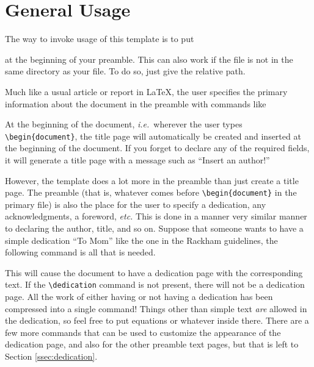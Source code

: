 \documentclass[thesis]{../cls/thesis-umich}
\begin{document}
\section{General Usage}
The way to invoke usage of this template is to put
at the beginning of your preamble.  This can also work if the
 file is not in the same directory as your
 file.  To do so, just give the relative path.

Much like a usual article or report in \LaTeX, the user specifies the
primary information about the document in the preamble with commands
like
\begin{code}
\author{Derek J. Dalle}
\end{code}
At the beginning of the document, \textit{i.e.}~wherever the user
types \verb|\begin{document}|, the title page will automatically be
created and inserted at the beginning of the document.  If you
forget to declare any of the required fields, it will generate a
title page with a message such as ``Insert an author!''

However, the template does a lot more in the preamble than just create
a title page.  The preamble (that is, whatever comes before
\verb|\begin{document}| in the primary  file) is also the
place for the user to specify a dedication, any acknowledgments, a
foreword, \textit{etc.}  This is done in a manner very similar manner
to declaring the author, title, and so on.  Suppose that someone wants
to have a simple dedication ``To Mom'' like the one in the Rackham
guidelines, the following command is all that is needed.
\begin{code}
\dedication{To Mom}
\end{code}
This will cause the document to have a dedication page with the
corresponding text.  If the \verb|\dedication| command is not present,
there will not be a dedication page.  All the work of either having or
not having a dedication has been compressed into a single command!
Things other than simple text \emph{are} allowed in the dedication, so
feel free to put equations or whatever inside there.  There are a few
more commands that can be used to customize the appearance of the
dedication page, and also for the other preamble text pages, but that
is left to Section \ref{ssec:dedication}.
\end{document}
